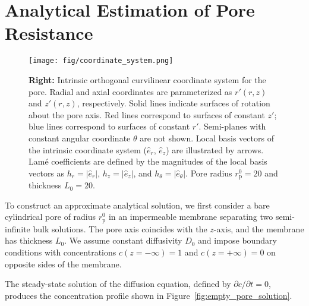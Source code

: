 \documentclass[10pt, a4paper, twocolumn]{article}
\begin{document}
\section{Analytical Estimation of Pore Resistance}
\begin{figure*}[h]
    \centering
    \texttt{[image: fig/coordinate\_system.png]}
    \caption{%
        \textbf{Left:}
        Steady-state solution of the diffusion equation for a point-like particle diffusing through an empty cylindrical pore of finite thickness.
        Iso-concentration surfaces, $c = \text{const}$, are represented by contour lines with labeled concentration values.
        Blue and red axes indicate radial and axial coordinates, respectively.
        Pore radius $r_{\text{p}}^{0} = 20$ and thickness $L_{0} = 20$.
    }
    \label{fig:empty_pore_solution}
    \caption{
        \textbf{Right:}
        Intrinsic orthogonal curvilinear coordinate system for the pore.
        Radial and axial coordinates are parameterized as $r'(r,z)$ and $z'(r,z)$, respectively.
        Solid lines indicate surfaces of rotation about the pore axis.
        Red lines correspond to surfaces of constant $z'$; blue lines correspond to surfaces of constant $r'$.
        Semi-planes with constant angular coordinate $\theta$ are not shown.
        Local basis vectors of the intrinsic coordinate system ($\hat{e}_r$, $\hat{e}_z$) are illustrated by arrows.
        Lamé coefficients are defined by the magnitudes of the local basis vectors as $h_r = |\hat{e}_r|$, $h_z = |\hat{e}_z|$, and $h_{\theta} = |\hat{e}_{\theta}|$.
        Pore radius $r_{\text{p}}^{0} = 20$ and thickness $L_{0} = 20$.
        }
    \label{fig:coordinate_system}
\end{figure*}



To construct an approximate analytical solution, we first consider a bare cylindrical pore of radius $r_{\text{p}}^{0}$ in an impermeable membrane separating two semi-infinite bulk solutions.
The pore axis coincides with the $z$-axis, and the membrane has thickness $L_{0}$.
We assume constant diffusivity $D_0$ and impose boundary conditions with concentrations $c(z=-\infty)=1$ and $c(z=+\infty)=0$ on opposite sides of the membrane.

The steady-state solution of the diffusion equation, defined by $\partial c/\partial t = 0$, produces the concentration profile shown in Figure~\ref{fig:empty_pore_solution}.
\end{document}
